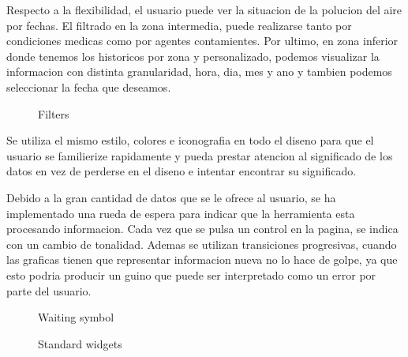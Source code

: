 Respecto a la flexibilidad, el usuario puede ver la situacion de la polucion del aire por fechas. El filtrado en la zona
intermedia, puede realizarse tanto por condiciones medicas como por agentes contamientes. Por ultimo, en zona inferior donde tenemos
los historicos por zona y personalizado, podemos visualizar la informacion con distinta granularidad, hora, dia, mes y ano y tambien podemos
seleccionar la fecha que deseamos.


\begin{figure}[ht]
    \centering
    \hfill
    \vfill
  
  \caption{Filters}
    \end{figure}


Se utiliza el mismo estilo, colores e iconografia en todo el diseno para que el usuario se familierize rapidamente y pueda
prestar atencion al significado de los datos en vez de perderse en el diseno e intentar encontrar su significado. 

Debido a la gran cantidad de datos que se le ofrece al usuario, se ha implementado una rueda de espera para indicar
que la herramienta esta procesando informacion. Cada vez que se pulsa un control en la pagina, se indica con un cambio
de tonalidad. Ademas se utilizan transiciones progresivas, cuando las graficas tienen que representar informacion nueva no lo hace 
de golpe, ya que esto podria producir un guino que puede ser interpretado como un error por parte del usuario.



\begin{figure}[ht]
    \centering

    \caption{Waiting symbol}
\end{figure}

\begin{figure}[ht]
    \centering
    \hfill
    \vfill
     \hfill
  
  \caption{Standard widgets}
    \end{figure}

